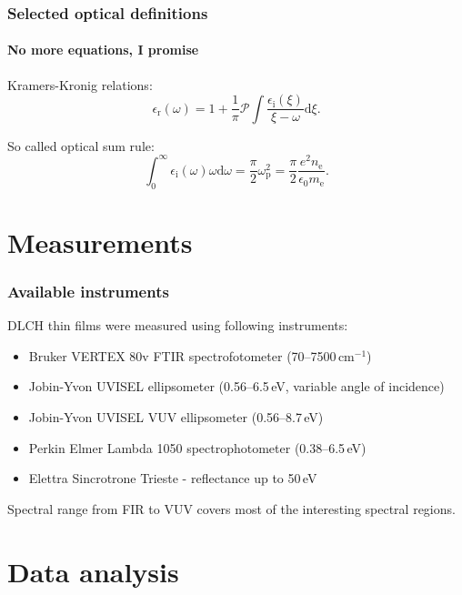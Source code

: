 \documentclass{beamer}
\begin{document}
\begin{frame}
    \frametitle{Selected optical definitions}
    \framesubtitle{No more equations, I promise}

Kramers-Kronig relations:
\begin{equation}
\epsilon_\mathrm{r}(\omega) = 1 + \frac{1}{\pi} \mathcal{P} \int \frac{\epsilon_\mathrm{i}(\xi)}{\xi - \omega} \mathrm{d}\xi \mathrm{.}
\label{KKint}
\end{equation}

So called optical sum rule:
\begin{equation}
\int_0^\infty \epsilon_\mathrm{i} (\omega) \omega \mathrm{d} \omega = \frac{\pi}{2} \omega_\mathrm{p}^2 = \frac{\pi}{2} \frac{e^2 n_\mathrm{e}}{ \epsilon_0 m_\mathrm{e}} \mathrm{.}
\end{equation}

\end{frame}

\section{Measurements}

\begin{frame}
   \frametitle{Available instruments}
   DLCH thin films were measured using following instruments:
	\begin{itemize}
	\item Bruker VERTEX 80v FTIR spectrofotometer (70--7500\,cm$^{-1}$)
	\item Jobin-Yvon UVISEL ellipsometer (0.56--6.5\,eV, variable angle of incidence)
	\item Jobin-Yvon UVISEL VUV ellipsometer (0.56--8.7\,eV)
	\item Perkin Elmer Lambda 1050 spectrophotometer (0.38--6.5\,eV)
	\item Elettra Sincrotrone Trieste - reflectance up to 50\,eV
	\end{itemize}
   Spectral range from FIR to VUV covers most of the interesting spectral regions.
\end{frame}

\section{Data analysis}
\end{document}
